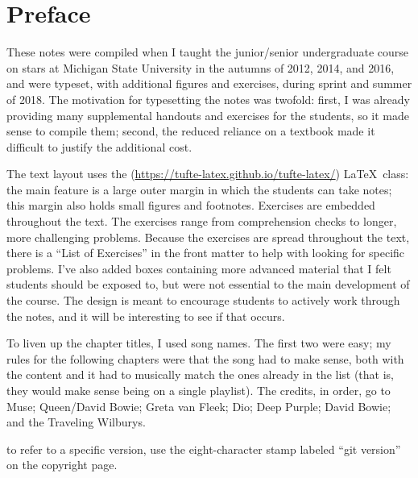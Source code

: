 
\section*{Preface}
These notes were compiled when I taught the junior/senior undergraduate course on stars at Michigan State University in the autumns of 2012, 2014, and 2016, and were typeset, with additional figures and exercises, during sprint and summer of 2018. The motivation for typesetting the notes was twofold: first, I was already providing many supplemental handouts and exercises for the students, so it made sense to compile them; second, the reduced reliance on a textbook made it difficult to justify the additional cost.

The text layout uses the  (\url{https://tufte-latex.github.io/tufte-latex/}) \LaTeX\ class: the main feature is a large outer margin in which the students can take notes; this margin also holds small figures and footnotes. Exercises are embedded throughout the text. The exercises range from comprehension checks to longer, more challenging problems.  Because the exercises are spread throughout the text, there is a ``List of Exercises'' in the front matter to help with looking for specific problems. I've also added boxes containing more advanced material that I felt students should be exposed to, but were not essential to the main development of the course. The design is meant to encourage students to actively work through the notes, and it will be interesting to see if that occurs.

To liven up the chapter titles, I used song names. The first two were easy; my rules for the following chapters were that the song had to make sense, both with the content and it had to musically match the ones already in the list (that is, they would make sense being on a single playlist). The credits, in order, go to Muse; Queen/David Bowie; Greta van Fleek; Dio; Deep Purple; David Bowie; and the Traveling Wilburys.

 to refer to a specific version, use the eight-character stamp labeled ``git version'' on the copyright page.
